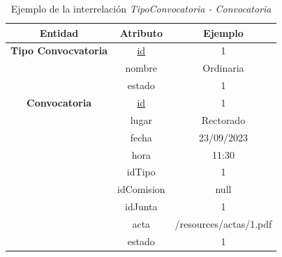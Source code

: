 \begin{itemize}
    \begin{table}[H]
    \centering
        \begin{tabular}{ | c | c | c |  }
             \hline
                 \textbf{Entidad} & \textbf{Atributo} & \textbf{Ejemplo}\\       
             \hline
                 \textbf{Tipo Convocvatoria}  & \underline{id} & 1\\
                  & nombre & Ordinaria\\
                  & estado & 1\\
             \hline
                 \textbf{Convocatoria}  & \underline{id} & 1\\
                  & lugar & Rectorado\\
                  & fecha & 23/09/2023\\
                  & hora & 11:30\\
                  & idTipo & 1\\
                  & idComision & null\\
                  & idJunta & 1\\
                  & acta & /resources/actas/1.pdf \\
                  & estado & 1\\
        \end{tabular}
        \caption{Ejemplo de la interrelación \textit{TipoConvocatoria - Convocatoria}}
        \label{table:I-TipConv-Conv}
    \end{table}
\end{itemize}

